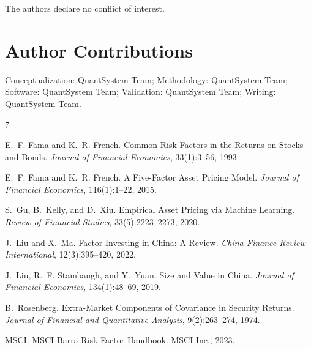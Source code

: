 \documentclass[12pt]{article}
\begin{document}
The authors declare no conflict of interest.

\section*{Author Contributions}

Conceptualization: QuantSystem Team; Methodology: QuantSystem Team; Software: QuantSystem Team; Validation: QuantSystem Team; Writing: QuantSystem Team.




\begin{thebibliography}{7}

E.~F. Fama and K.~R. French.
\newblock Common Risk Factors in the Returns on Stocks and Bonds.
\newblock \emph{Journal of Financial Economics}, 33(1):3--56, 1993.

E.~F. Fama and K.~R. French.
\newblock A Five-Factor Asset Pricing Model.
\newblock \emph{Journal of Financial Economics}, 116(1):1--22, 2015.

S.~Gu, B.~Kelly, and D.~Xiu.
\newblock Empirical Asset Pricing via Machine Learning.
\newblock \emph{Review of Financial Studies}, 33(5):2223--2273, 2020.

J.~Liu and X.~Ma.
\newblock Factor Investing in China: A Review.
\newblock \emph{China Finance Review International}, 12(3):395--420, 2022.

J.~Liu, R.~F. Stambaugh, and Y.~Yuan.
\newblock Size and Value in China.
\newblock \emph{Journal of Financial Economics}, 134(1):48--69, 2019.

B.~Rosenberg.
\newblock Extra-Market Components of Covariance in Security Returns.
\newblock \emph{Journal of Financial and Quantitative Analysis}, 9(2):263--274, 1974.

MSCI.
\newblock MSCI Barra Risk Factor Handbook.
\newblock MSCI Inc., 2023.

\end{thebibliography}
\end{document}
